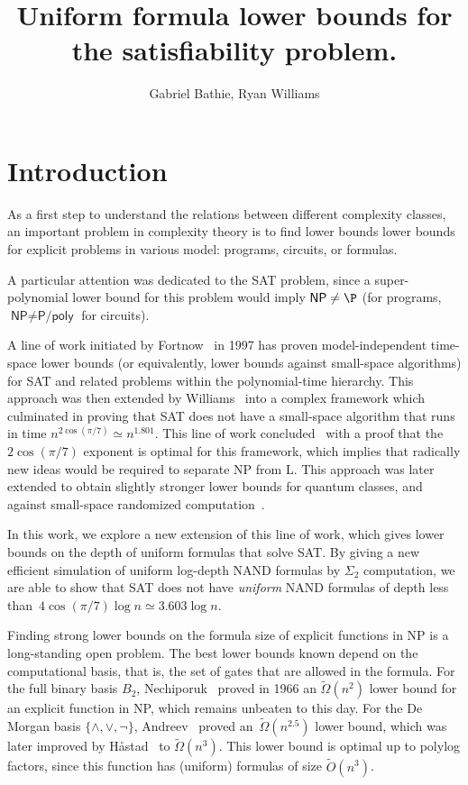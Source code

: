 \documentclass[a4paper, 11pt]{article}
\title{Uniform formula lower bounds for the satisfiability problem.}
\author{Gabriel Bathie, Ryan Williams}
\theoremstyle{plain}
\theoremstyle{definition}
\theoremstyle{remark}
\newcommand{\Omegat}[1]{\widetilde{\Omega}\left( #1 \right)}%
\newcommand{\Ot}[1]{\widetilde{O}\left( #1 \right)}%
\newcommand{\Log}{\textsf{L}}%
\newcommand{\NP}{\textsf{NP}}%
\newcommand{\SAT}{\textsf{SAT}}%
\newcommand{\NAND}{\textsf{NAND}}%
\begin{document}
\maketitle

\begin{abstract}
\end{abstract}

\section{Introduction}

As a first step to understand the relations between different complexity classes,
an important problem in complexity theory is to find
lower bounds lower bounds for explicit problems in various model: programs, circuits, or formulas.

A particular attention was dedicated to the \SAT{} problem, 
since a super-polynomial lower bound for this problem would imply $\NP \neq \P$
(for programs, $\NP \neq \textsf{P/poly}$ for circuits).

A line of work initiated by Fortnow~\cite{fortnow2000time,fortnow2005time} in 1997 
has proven model-independent time-space lower bounds
(or equivalently, lower bounds against small-space algorithms) for \SAT{}
and related problems within the polynomial-time hierarchy.
This approach was then extended by Williams~\cite{williams2006inductive,williams2007time,williams2013alternation} 
into a complex framework which culminated in proving that \SAT{} 
does not have a small-space algorithm that runs in time $n^{2\cos(\pi/7)}  \simeq n^{1.801}$.
This line of work concluded~\cite{buss2015limits} with a proof 
that the $2\cos(\pi/7)$ exponent is optimal for this framework,
which implies that radically new ideas would be required to separate \NP{} from \Log{}.
This approach was later extended to obtain slightly stronger lower bounds
for quantum classes, and against small-space randomized computation~\cite{mudigonda2020time}.

In this work, we explore a new extension of this line of work, 
which gives lower bounds on the depth of uniform formulas that solve \SAT{}.
By giving a new efficient simulation of uniform log-depth \NAND{} formulas 
by $\Sigma_2$ computation, we are able to show that \SAT{}
does not have \textit{uniform} \NAND{} formulas 
of depth less than~$4 \cos(\pi/7) \log n \simeq 3.603 \log n$.

Finding strong lower bounds on the formula size of explicit functions in \NP{}
is a long-standing open problem.
The best lower bounds known depend on the computational basis, that is, 
the set of gates that are allowed in the formula.
For the full binary basis $B_2$, Nechiporuk~\cite{nechiporuk66boolean}
proved in 1966 an $\Omegat{n^2}$ lower bound for an explicit function in \NP{}, 
which remains unbeaten to this day.
For the De Morgan basis $\{\wedge, \vee, \neg\}$, Andreev~\cite{andreev1987method} 
proved an~$\Omegat{n^{2.5}}$ lower bound, 
which was later improved by H{\aa}stad~\cite{hastad1998shrinkage} to $\Omegat{n^{3}}$.
This lower bound is optimal up to polylog factors,
since this function has (uniform) formulas of size $\Ot{n^{3}}$.
\end{document}
